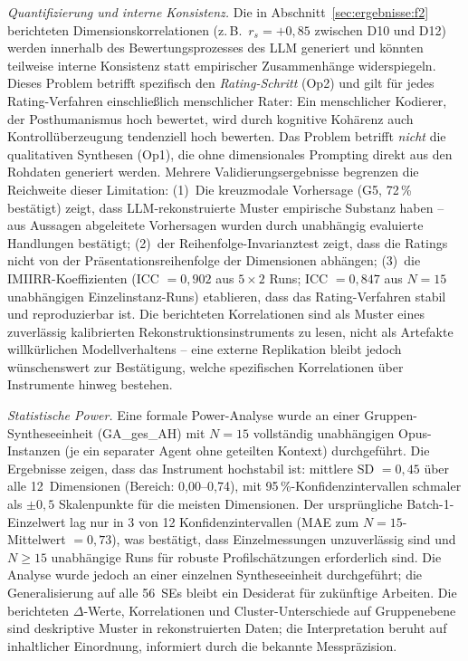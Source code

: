 \documentclass[12pt,a4paper]{article}
\begin{document}
\emph{Quantifizierung und interne Konsistenz.} Die in Abschnitt~\ref{sec:ergebnisse:f2} berichteten Dimensionskorrelationen (z.\,B.\ $r_s = +0{,}85$ zwischen D10 und D12) werden innerhalb des Bewertungsprozesses des LLM generiert und könnten teilweise interne Konsistenz statt empirischer Zusammenhänge widerspiegeln. Dieses Problem betrifft spezifisch den \emph{Rating-Schritt} (Op2) und gilt für jedes Rating-Verfahren einschließlich menschlicher Rater: Ein menschlicher Kodierer, der Posthumanismus hoch bewertet, wird durch kognitive Kohärenz auch Kontrollüberzeugung tendenziell hoch bewerten. Das Problem betrifft \emph{nicht} die qualitativen Synthesen (Op1), die ohne dimensionales Prompting direkt aus den Rohdaten generiert werden. Mehrere Validierungsergebnisse begrenzen die Reichweite dieser Limitation: (1)~Die kreuzmodale Vorhersage (G5, 72\,\% bestätigt) zeigt, dass LLM-rekonstruierte Muster empirische Substanz haben -- aus Aussagen abgeleitete Vorhersagen wurden durch unabhängig evaluierte Handlungen bestätigt; (2)~der Reihenfolge-Invarianztest zeigt, dass die Ratings nicht von der Präsentationsreihenfolge der Dimensionen abhängen; (3)~die IMIIRR-Koeffizienten (ICC $= 0{,}902$ aus $5 \times 2$ Runs; ICC $= 0{,}847$ aus $N = 15$ unabhängigen Einzelinstanz-Runs) etablieren, dass das Rating-Verfahren stabil und reproduzierbar ist. Die berichteten Korrelationen sind als Muster eines zuverlässig kalibrierten Rekonstruktionsinstruments zu lesen, nicht als Artefakte willkürlichen Modellverhaltens -- eine externe Replikation bleibt jedoch wünschenswert zur Bestätigung, welche spezifischen Korrelationen über Instrumente hinweg bestehen.

\emph{Statistische Power.} Eine formale Power-Analyse wurde an einer Grup\-pen-Syn\-the\-se\-ein\-heit (GA\_ges\_AH) mit $N = 15$ vollständig unabhängigen Opus-Instanzen (je ein separater Agent ohne geteilten Kontext) durchgeführt. Die Ergebnisse zeigen, dass das Instrument hochstabil ist: mittlere SD $= 0{,}45$ über alle 12~Dimensionen (Bereich: 0,00--0,74), mit 95\,\%-Konfidenzintervallen schmaler als $\pm 0{,}5$ Skalenpunkte für die meisten Dimensionen. Der ursprüngliche Batch-1-Einzelwert lag nur in 3 von 12 Konfidenzintervallen (MAE zum $N = 15$-Mittelwert $= 0{,}73$), was bestätigt, dass Einzelmessungen unzuverlässig sind und $N \geq 15$ unabhängige Runs für robuste Profilschätzungen erforderlich sind. Die Analyse wurde jedoch an einer einzelnen Syntheseeinheit durchgeführt; die Generalisierung auf alle 56~SEs bleibt ein Desiderat für zukünftige Arbeiten. Die berichteten $\Delta$-Werte, Korrelationen und Cluster-Unterschiede auf Gruppenebene sind deskriptive Muster in rekonstruierten Daten; die Interpretation beruht auf inhaltlicher Einordnung, informiert durch die bekannte Messpräzision.
\end{document}
